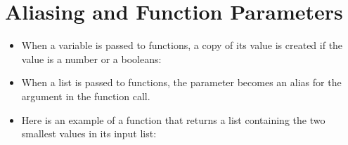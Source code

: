 \documentclass[letterpaper,10pt,english]{sphinxmanual}
\begin{document}
\section{Aliasing and Function Parameters}
\label{\detokenize{lecture_notes/lec10_lists2:aliasing-and-function-parameters}}\begin{itemize}
\item {} 
When a variable is passed to functions, a copy of its value is
created if the value is a number or a booleans:

%
\begin{sphinxVerbatim}[commandchars=\\\{\}]
  
      
     

  
  
 
 
\end{sphinxVerbatim}

\item {} 
When a list is passed to functions, the parameter becomes an alias
for the argument in the function call.

\item {} 
Here is an example of a function that returns a list containing the
two smallest values in its input list:

%
\begin{sphinxVerbatim}[commandchars=\\\{\}]
 
       \PYG{p}{[}\PYG{p}{]}
        
         \PYG{p}{[}\PYG{p}{]}
            
             \PYG{p}{[}\PYG{p}{]}
      


\end{sphinxVerbatim}
\end{itemize}
\end{document}

